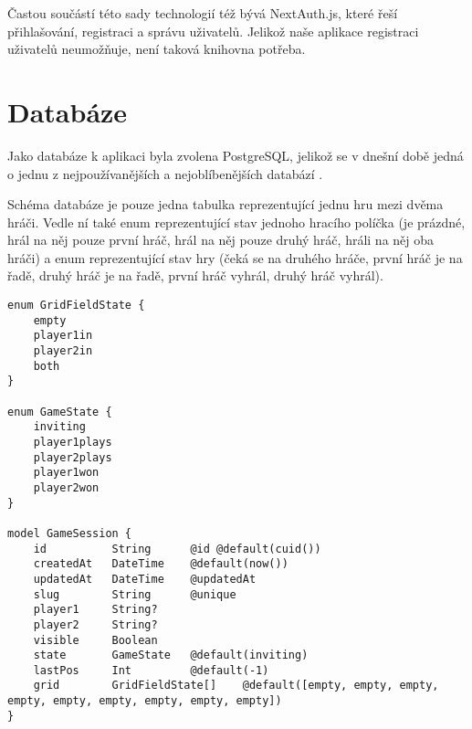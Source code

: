 Častou součástí této sady technologií též bývá NextAuth.js, které řeší přihlašování, registraci a správu uživatelů. Jelikož naše aplikace registraci uživatelů neumožňuje, není taková knihovna potřeba.

\section{Databáze}

Jako databáze k aplikaci byla zvolena PostgreSQL, jelikož se v dnešní době
jedná o jednu z nejpoužívanějších a nejoblíbenějších databází \cite{stackoverflow23}.

Schéma databáze je pouze jedna tabulka  reprezentující jednu hru
mezi dvěma hráči. Vedle ní také enum  reprezentující stav
jednoho hracího políčka (je prázdné, hrál na něj pouze první hráč, hrál na něj
pouze druhý hráč, hráli na něj oba hráči) a enum  reprezentující
stav hry (čeká se na druhého hráče, první hráč je na řadě, druhý hráč je na
řadě, první hráč vyhrál, druhý hráč vyhrál).

\begin{lstlisting}[language=Prisma]
enum GridFieldState {
    empty
    player1in
    player2in
    both
}

enum GameState {
    inviting
    player1plays
    player2plays
    player1won
    player2won
}

model GameSession {
    id          String      @id @default(cuid())
    createdAt   DateTime    @default(now())
    updatedAt   DateTime    @updatedAt
    slug        String      @unique
    player1     String?
    player2     String?
    visible     Boolean
    state       GameState   @default(inviting)
    lastPos     Int         @default(-1)
    grid        GridFieldState[]    @default([empty, empty, empty, empty, empty, empty, empty, empty, empty])
}
\end{lstlisting}
